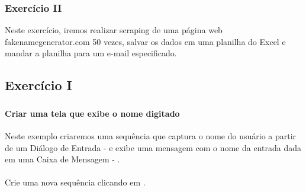\documentclass[letterpaper,10pt,brazil]{sphinxmanual}
\begin{document}
{\hyperref[\detokenize{exercise_1::doc}]{}}


\subsubsection{Exercício II}
\label{\detokenize{exercises:exercicio-ii}}
Neste exercício, iremos realizar scraping de uma página web \textendash{} fakenamegenerator.com \textendash{} 50 vezes, salvar os dados em uma planilha do Excel e mandar a planilha para um e-mail especificado.

{\hyperref[\detokenize{exercise_2::doc}]{}}


\subsection{Exercício I}
\label{\detokenize{exercise_1:exercicio-i}}\label{\detokenize{exercise_1::doc}}

\subsubsection{}
\label{\detokenize{exercise_1:id1}}

\paragraph{Criar uma tela que exibe o nome digitado}
\label{\detokenize{exercise_1:criar-uma-tela-que-exibe-o-nome-digitado}}
Neste exemplo criaremos uma sequência que captura o nome do usuário a partir de um Diálogo de Entrada  -  e exibe uma mensagem  com o nome da entrada dada em uma Caixa de Mensagem - .


\paragraph{}
\label{\detokenize{exercise_1:i-crie-uma-nova-sequencia}}
Crie uma nova sequência clicando em .

\begin{figure}[htbp]
\centering

\noindent{}
\end{figure}
\end{document}
